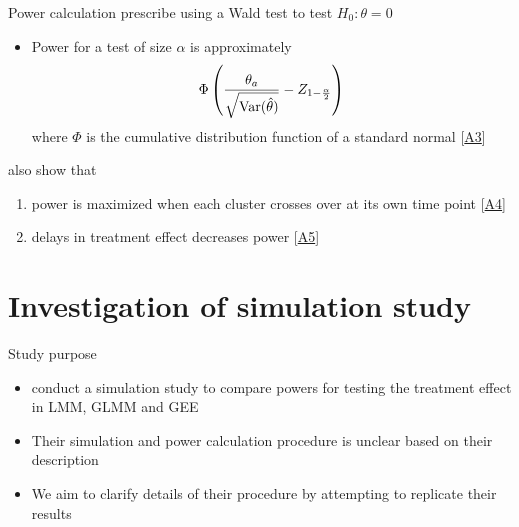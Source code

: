 \documentclass[9pt]{beamer}
\begin{document}
\begin{frame}{Power calculation} \label{slide:power}
\citet{Hussey:2007} prescribe using a Wald test to test $H_0:\theta=0$
\begin{itemize}
\item
Power for a test of size $\alpha$ is approximately
\[
\Phi\left(\frac{\theta_a}{\sqrt{\mathrm{Var}(\hat{\theta})}} - Z_{1-\frac{\alpha}{2}}\right)
\]
where $\Phi$ is the cumulative distribution function of a standard normal [\hyperlink{apx:power}{A3}]
\end{itemize}
\vspace{2em}

\citet{Hussey:2007} also show that
\begin{enumerate}

\item
power is maximized when each cluster crosses over at its own time point [\hyperlink{apx:timepoints}{A4}]

\item
delays in treatment effect decreases power [\hyperlink{apx:delay}{A5}]

\end{enumerate}
\end{frame}



\section{Investigation of simulation study}



\begin{frame}{Study purpose}
\begin{itemize}
\setlength\itemsep{2em}

\item
\citet{Hussey:2007} conduct a simulation study to compare powers for testing the treatment effect in LMM, GLMM and GEE

\item
Their simulation and power calculation procedure is unclear based on their description

\item
We aim to clarify details of their procedure by attempting to replicate their results

\end{itemize}
\end{frame}
\end{document}
